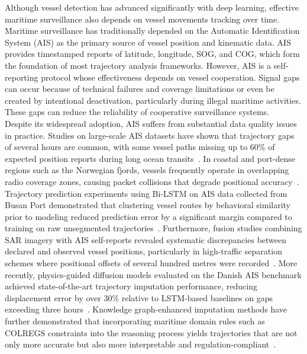 Although vessel detection has advanced significantly with deep learning, effective maritime surveillance also depends on vessel movements tracking over time. Maritime surveillance has traditionally depended on the Automatic Identification System (AIS) as the primary source of vessel position and kinematic data. AIS provides timestamped reports of latitude, longitude, SOG, and COG, which form the foundation of most trajectory analysis frameworks. However, AIS is a self-reporting protocol whose effectiveness depends on vessel cooperation. Signal gaps can occur because of technical failures and coverage limitations or even be created by intentional deactivation, particularly during illegal maritime activities. These gaps can reduce the reliability of cooperative surveillance systems. \\

Despite its widespread adoption, AIS suffers from substantial data quality issues in practice. Studies on large-scale AIS datasets have shown that trajectory gaps of several hours are common, with some vessel paths missing up to 60\% of expected position reports during long ocean transits~\cite{10.1145/3637528.3672086}. In coastal and port-dense regions such as the Norwegian fjords, vessels frequently operate in overlapping radio coverage zones, causing packet collisions that degrade positional accuracy~\cite{s22052058}. Trajectory prediction experiments using Bi-LSTM on AIS data collected from Busan Port demonstrated that clustering vessel routes by behavioral similarity prior to modeling reduced prediction error by a significant margin compared to training on raw unsegmented trajectories~\cite{jmse9091037}. Furthermore, fusion studies combining SAR imagery with AIS self-reports revealed systematic discrepancies between declared and observed vessel positions, particularly in high-traffic separation schemes where positional offsets of several hundred metres were recorded~\cite{7093130}. More recently, physics-guided diffusion models evaluated on the Danish AIS benchmark achieved state-of-the-art trajectory imputation performance, reducing displacement error by over 30\% relative to LSTM-based baselines on gaps exceeding three hours~\cite{10.1145/3637528.3672086}. Knowledge graph-enhanced imputation methods have further demonstrated that incorporating maritime domain rules such as COLREGS constraints into the reasoning process yields trajectories that are not only more accurate but also more interpretable and regulation-compliant~\cite{liu2026vista}. \\

